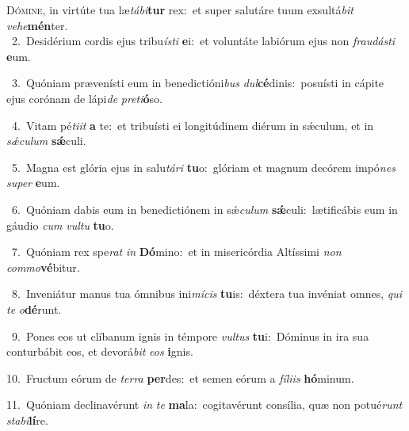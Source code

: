\lettrine{\initial\textcolor{\initialcolor}{D}}{ómine,} in virtúte tua læ\-\textit{tá}\-\textit{bi}\textbf{tur} rex:~\star et super salutáre tuum exsultá\textit{bit} \textit{ve}\-\textit{he}\textbf{mén}ter.\\
{\numbfont\textcolor{\numbcolor}{~2.}}~Desidérium cordis ejus tribu\-\textit{ís}\-\textit{ti} \textbf{e}\-i:~\star et voluntáte labiórum ejus non \textit{frau}\-\textit{dás}\textit{ti} \textbf{e}\-um.\par
{\numbfont\textcolor{\numbcolor}{~3.}}~Quóniam prævenísti eum in benedictióni\textit{bus} \textit{dul}\-\textbf{cé}dinis:~\star posuísti in cápite ejus corónam de lápi\textit{de} \textit{pre}\-\textit{ti}\textbf{ó}so.\par
{\numbfont\textcolor{\numbcolor}{~4.}}~Vitam pé\-\textit{ti}\-\textit{it} \textbf{a} te:~\star et tribuísti ei longitúdinem diérum in sǽculum, et in \textit{sǽ}\-\textit{cu}\textit{lum} \textbf{sǽ}\-culi.\par
{\numbfont\textcolor{\numbcolor}{~5.}}~Magna est glória ejus in salu\-\textit{tá}\-\textit{ri} \textbf{tu}\-o:~\star glóriam et magnum decórem impó\textit{nes} \textit{su}\-\textit{per} \textbf{e}\-um.\par
{\numbfont\textcolor{\numbcolor}{~6.}}~Quóniam dabis eum in benedictiónem in sǽ\-\textit{cu}\-\textit{lum} \textbf{sǽ}\-culi:~\star lætificábis eum in gáudio \textit{cum} \textit{vul}\-\textit{tu} \textbf{tu}\-o.\par
{\numbfont\textcolor{\numbcolor}{~7.}}~Quóniam rex spe\textit{rat} \textit{in} \textbf{Dó}\-mino:~\star et in misericórdia Altíssimi \textit{non} \textit{com}\-\textit{mo}\textbf{vé}bitur.\par
{\numbfont\textcolor{\numbcolor}{~8.}}~Inveniátur manus tua ómnibus ini\-\textit{mí}\-\textit{cis} \textbf{tu}\-is:~\star déxtera tua invéniat omnes, \textit{qui} \textit{te} \textit{o}\-\textbf{dé}runt.\par
{\numbfont\textcolor{\numbcolor}{~9.}}~Pones eos ut clíbanum ignis in témpore \textit{vul}\-\textit{tus} \textbf{tu}\-i:~\star Dóminus in ira sua conturbábit eos, et devorá\textit{bit} \textit{e}\-\textit{os} \textbf{i}\-gnis.\par
{\numbfont\textcolor{\numbcolor}{10.}}~Fructum eórum de \textit{ter}\-\textit{ra} \textbf{per}\-des:~\star et semen eórum a \textit{fí}\-\textit{li}\textit{is} \textbf{hó}\-minum.\par
{\numbfont\textcolor{\numbcolor}{11.}}~Quóniam declinavérunt \textit{in} \textit{te} \textbf{ma}\-la:~\star cogitavérunt consília, quæ non potué\textit{runt} \textit{sta}\-\textit{bi}\textbf{lí}re.\par
